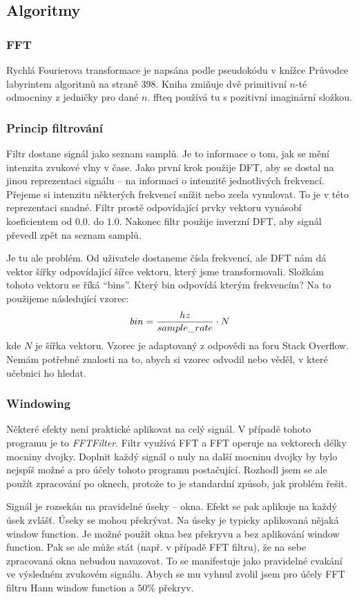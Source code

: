 \documentclass{article}
\begin{document}
\subsection*{Algoritmy}

\subsubsection*{FFT}
Rychlá Fourierova transformace je napsána podle pseudokódu v knížce Průvodce
labyrintem algoritmů\cite{pruvodce} na straně 398. Kniha zmiňuje dvě primitivní
$n$-té odmocniny z jedničky pro dané $n$. ffteq používá tu s pozitivní
imaginární složkou.

\subsubsection*{Princip filtrování}
Filtr dostane signál jako seznam samplů. Je to informace o tom, jak se mění
intenzita zvukové vlny v čase. Jako první krok použije DFT, aby se dostal na
jinou reprezentaci signálu -- na informaci o intenzitě jednotlivých frekvencí.
Přejeme si intenzitu některých frekvencí snížit nebo zcela vynulovat. To je v
této reprezentaci snadné. Filtr prostě odpovídající prvky vektoru vynásobí
koeficientem od $0.0$. do $1.0$. Nakonec filtr použije inverzní DFT, aby signál
převedl zpět na seznam samplů.

Je tu ale problém. Od uživatele dostaneme čísla frekvencí, ale DFT nám dá
vektor šířky odpovídající šířce vektoru, který jsme transformovali.
Složkám tohoto vektoru se říká \enquote{bins}. Který bin odpovídá kterým
frekvencím? Na to použijeme následující vzorec:
$$
bin = {{hz \over sample\_rate} \cdot {N}}
$$
kde $N$ je šířka vektoru. Vzorec je adaptovaný z odpovědi na foru Stack
Overflow\cite{overflow}. Nemám potřebné znalosti na to, abych si vzorec odvodil
nebo věděl, v které učebnici ho hledat.

\subsubsection*{Windowing}
Některé efekty není praktické aplikovat na celý signál. V případě tohoto
programu je to \emph{FFTFilter}. Filtr využívá FFT a FFT operuje na vektorech
délky mocniny dvojky. Doplnit každý signál o nuly na další mocninu dvojky by
bylo nejspíš možné a pro účely tohoto programu postačující. Rozhodl jsem se ale
použít zpracování po oknech, protože to je standardní způsob, jak problém
řešit.

Signál je rozsekán na pravidelné úseky -- okna. Efekt se pak aplikuje na každý
úsek zvlášť. Úseky se mohou překrývat. Na úseky je typicky aplikovaná nějaká
window function. Je možné použít okna bez překryvu a bez aplikování window
function. Pak se ale může stát (např. v případě FFT filtru), že na sebe
zpracovaná okna nebudou navazovat. To se manifestuje jako pravidelné cvakání ve
výsledném zvukovém signálu. Abych se mu vyhnul zvolil jsem pro účely FFT filtru
Hann window function a $50\%$ překryv.
\end{document}
